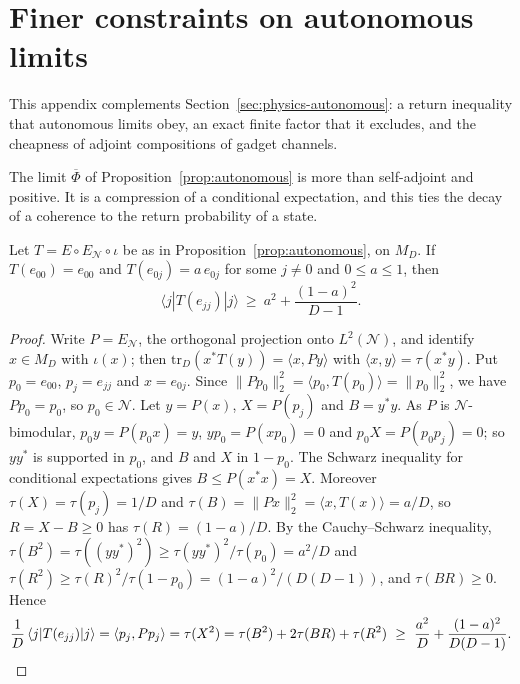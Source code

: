 \section{Finer constraints on autonomous limits}\label{sec:physics-finer}

This appendix complements Section~\ref{sec:physics-autonomous}: a return inequality that autonomous limits obey, an exact finite
factor that it excludes, and the cheapness of adjoint compositions of gadget channels.

The limit $\overline\Phi$ of Proposition~\ref{prop:autonomous} is more than self-adjoint and positive. It is a compression of a conditional
expectation, and this ties the decay of a coherence to the return probability of a state.

\begin{proposition}\label{prop:return}
Let $T=E\circ E_{\mathcal N}\circ\iota$ be as in Proposition~\ref{prop:autonomous}, on $M_D$. If $T(e_{00})=e_{00}$ and $T(e_{0j})=a\,e_{0j}$ for some
$j\ne0$ and $0\le a\le1$, then
\[
\langle j|T(e_{jj})|j\rangle\ \ge\ a^2+\frac{(1-a)^2}{D-1}.
\]
\end{proposition}

\begin{proof}
Write $P=E_{\mathcal N}$, the orthogonal projection onto $L^2(\mathcal N)$, and identify $x\in M_D$ with $\iota(x)$; then
$\mathrm{tr}_D(x^*T(y))=\langle x,Py\rangle$ with $\langle x,y\rangle=\tau(x^*y)$. Put $p_0=e_{00}$, $p_j=e_{jj}$ and $x=e_{0j}$. Since
$\|Pp_0\|_2^2=\langle p_0,T(p_0)\rangle=\|p_0\|_2^2$, we have $Pp_0=p_0$, so $p_0\in\mathcal N$. Let $y=P(x)$, $X=P(p_j)$ and $B=y^*y$. As $P$ is
$\mathcal N$-bimodular, $p_0y=P(p_0x)=y$, $yp_0=P(xp_0)=0$ and $p_0X=P(p_0p_j)=0$; so $yy^*$ is supported in $p_0$, and $B$ and $X$ in $1-p_0$. The
Schwarz inequality for conditional expectations gives $B\le P(x^*x)=X$. Moreover $\tau(X)=\tau(p_j)=1/D$ and $\tau(B)=\|Px\|_2^2=\langle x,T(x)\rangle=a/D$,
so $R=X-B\ge0$ has $\tau(R)=(1-a)/D$. By the Cauchy--Schwarz inequality, $\tau(B^2)=\tau((yy^*)^2)\ge\tau(yy^*)^2/\tau(p_0)=a^2/D$ and
$\tau(R^2)\ge\tau(R)^2/\tau(1-p_0)=(1-a)^2/(D(D-1))$, and $\tau(BR)\ge0$. Hence
\[
\frac1D\,\langle j|T(e_{jj})|j\rangle=\langle p_j,Pp_j\rangle=\tau(X^2)=\tau(B^2)+2\tau(BR)+\tau(R^2)\ \ge\ \frac{a^2}D+\frac{(1-a)^2}{D(D-1)} .\qedhere
\]
\end{proof}

